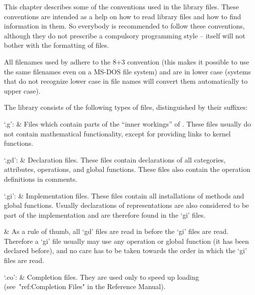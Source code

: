 

This chapter describes some of the conventions used in the {\GAP}
library files.
These conventions are intended as a help on how to read library files and
how to find information in them.
So everybody is recommended to follow these conventions,
although they do not prescribe a compulsory programming style
--{\GAP} itself will not bother with the formatting of files.

All filenames used by {\GAP} adhere to the 8+3 convention (this makes it
possible to use the same filenames even on a MS-DOS file system) and are in
lower case (systems that do not recognize lower case in file names will
convert them automatically to upper case).


The {\GAP} library consists of the following types of files, distinguished
by their suffixes:

\beginitems
`.g': &
    Files which contain parts of the ``inner workings'' of {\GAP}.
    These files usually do not contain mathematical functionality,
    except for providing links to kernel functions.

`.gd': &
    Declaration files.
    These files contain declarations of all categories, attributes,
    operations, and global functions.
    These files also contain the operation definitions in comments.

`.gi': &
    Implementation files.
    These files contain all installations of methods and global functions.
    Usually declarations of representations are also considered to be
    part of the implementation and are therefore found in the `gi' files.

    &
    As a rule of thumb, all `gd' files are read in before the `gi' files
    are read.
    Therefore a `gi' file usually may use any operation or global function
    (it has been declared before),
    and no care has to be taken towards the order in which the `gi' files
    are read.

`.co': &
    Completion files.
    They are used only to speed up loading
    (see~"ref:Completion Files" in the Reference Manual).
\enditems

